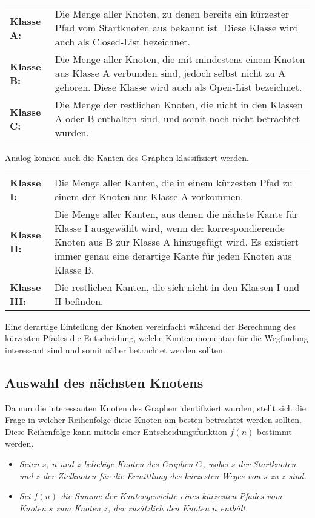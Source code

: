 		\begin{longtable}{p{2.5cm} p{10cm}}	
			\textbf{Klasse A:} & Die Menge aller Knoten, zu denen bereits ein kürzester Pfad  vom Startknoten aus bekannt ist. Diese Klasse wird auch als Closed-List bezeichnet.\\[0.25cm]
			\textbf{Klasse B:} & Die Menge aller Knoten, die mit mindestens einem Knoten aus Klasse A verbunden sind, jedoch selbst nicht zu A gehören. Diese Klasse wird auch als Open-List bezeichnet.\\[0.25cm]
			\textbf{Klasse C:} & Die Menge der restlichen Knoten, die nicht in den Klassen A oder B enthalten sind, und somit noch nicht betrachtet wurden.\\[0.25cm]
		\end{longtable}
		
		Analog können auch die Kanten des Graphen klassifiziert werden.
	
		\begin{longtable}{p{2.5cm} p{10cm}}
			\textbf{Klasse I:} & Die Menge aller Kanten, die in einem kürzesten Pfad zu einem der Knoten aus Klasse A vorkommen.\\[0.25cm]
			\textbf{Klasse II:} & Die Menge aller Kanten, aus denen die nächste Kante für Klasse I ausgewählt wird, wenn der korrespondierende Knoten aus B zur Klasse A hinzugefügt wird. Es existiert immer genau eine derartige Kante für jeden Knoten aus Klasse B. \\[0.25cm]
			\textbf{Klasse III:} & Die restlichen Kanten, die sich nicht in den Klassen I und II befinden.\\[0.25cm]
		\end{longtable}
		
		Eine derartige Einteilung der Knoten vereinfacht während der Berechnung des kürzesten Pfades die Entscheidung, welche Knoten momentan für die Wegfindung interessant sind und somit näher betrachtet werden sollten.
		
	\subsection{Auswahl des nächsten Knotens}
		\label{Abschaetz}
		Da nun die interessanten Knoten des Graphen identifiziert wurden, stellt sich die Frage in welcher Reihenfolge diese Knoten am besten betrachtet werden sollten.
		Diese Reihenfolge kann mittels einer Entscheidungsfunktion $f(n)$ bestimmt werden.
		
		\begin{itemize}
			\item \textit{Seien $s$, $n$ und $z$ beliebige Knoten des Graphen $G$, wobei $s$ der Startknoten und $z$ der Zielknoten für die Ermittlung des kürzesten Weges von $s$ zu $z$ sind.}\\
			\item \textit{Sei $f(n)$ die Summe der Kantengewichte eines kürzesten Pfades vom Knoten $s$ zum Knoten $z$, der zusätzlich den Knoten $n$ enthält.}
		\end{itemize}
		
